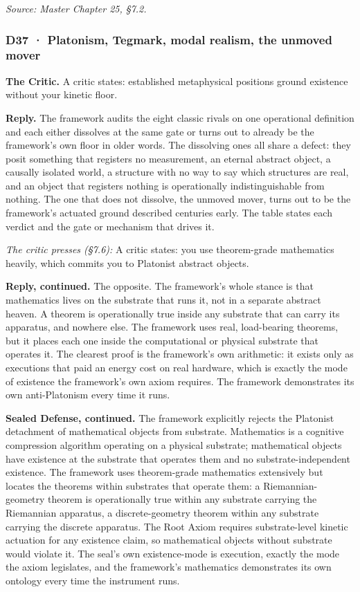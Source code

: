 \documentclass[10pt,twocolumn]{article}
\begin{document}
\emph{Source: Master Chapter 25, §7.2.}

\hypertarget{d37-platonism-tegmark-modal-realism-the-unmoved-mover}{%
\subsubsection{D37 · Platonism, Tegmark, modal realism, the unmoved
mover}\label{d37-platonism-tegmark-modal-realism-the-unmoved-mover}}

\textbf{The Critic.} A critic states: established metaphysical positions
ground existence without your kinetic floor.

\textbf{Reply.} The framework audits the eight classic rivals on one
operational definition and each either dissolves at the same gate or
turns out to already be the framework's own floor in older words. The
dissolving ones all share a defect: they posit something that registers
no measurement, an eternal abstract object, a causally isolated world, a
structure with no way to say which structures are real, and an object
that registers nothing is operationally indistinguishable from nothing.
The one that does not dissolve, the unmoved mover, turns out to be the
framework's actuated ground described centuries early. The table states
each verdict and the gate or mechanism that drives it.

\emph{The critic presses (§7.6):} A critic states: you use theorem-grade
mathematics heavily, which commits you to Platonist abstract objects.

\textbf{Reply, continued.} The opposite. The framework's whole stance is
that mathematics lives on the substrate that runs it, not in a separate
abstract heaven. A theorem is operationally true inside any substrate
that can carry its apparatus, and nowhere else. The framework uses real,
load-bearing theorems, but it places each one inside the computational
or physical substrate that operates it. The clearest proof is the
framework's own arithmetic: it exists only as executions that paid an
energy cost on real hardware, which is exactly the mode of existence the
framework's own axiom requires. The framework demonstrates its own
anti-Platonism every time it runs.

\textbf{Sealed Defense, continued.} The framework explicitly rejects the
Platonist detachment of mathematical objects from substrate. Mathematics
is a cognitive compression algorithm operating on a physical substrate;
mathematical objects have existence at the substrate that operates them
and no substrate-independent existence. The framework uses theorem-grade
mathematics extensively but locates the theorems within substrates that
operate them: a Riemannian-geometry theorem is operationally true within
any substrate carrying the Riemannian apparatus, a discrete-geometry
theorem within any substrate carrying the discrete apparatus. The Root
Axiom requires substrate-level kinetic actuation for any existence
claim, so mathematical objects without substrate would violate it. The
seal's own existence-mode is execution, exactly the mode the axiom
legislates, and the framework's mathematics demonstrates its own
ontology every time the instrument runs.
\end{document}
